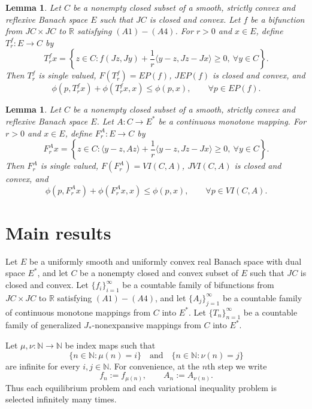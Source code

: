 \documentclass[leqno,12pt]{amsart}
\newtheorem{lemma}[theorem]{Lemma}
\theoremstyle{definition}
\numberwithin{equation}{section}
\begin{document}
\begin{lemma}\label{EPrezolvent}
Let $C$ be a nonempty closed subset of a smooth, strictly convex and reflexive Banach space $E$ such that $JC$ is closed and convex. Let $f$ be a bifunction from $JC\times JC$ to $\mathbb{R}$ satisfying $(A1)-(A4)$. For $r>0$ and $x\in E$, define $T_r^f:E\to C$ by
\[
T_r^f x=\left\{z\in C:f(Jz,Jy)+\frac{1}{r}\langle y-z,Jz-Jx\rangle\geq 0,\ \forall y\in C\right\}.
\]
Then $T_r^f$ is single valued, $F(T_r^f)=EP(f)$, $JEP(f)$ is closed and convex, and
\[
\phi(p,T_r^f x)+\phi(T_r^f x,x)\leq \phi(p,x),\qquad \forall p\in EP(f).
\]
\end{lemma}

\begin{lemma}\label{VIrezolvent}
Let $C$ be a nonempty closed subset of a smooth, strictly convex and reflexive Banach space $E$. Let $A:C\to E^{*}$ be a continuous monotone mapping. For $r>0$ and $x\in E$, define $F_r^A:E\to C$ by
\[
F_r^A x=\left\{z\in C:\langle y-z,Az\rangle+\frac{1}{r}\langle y-z,Jz-Jx\rangle\geq 0,\ \forall y\in C\right\}.
\]
Then $F_r^A$ is single valued, $F(F_r^A)=VI(C,A)$, $JVI(C,A)$ is closed and convex, and
\[
\phi(p,F_r^A x)+\phi(F_r^A x,x)\leq \phi(p,x),\qquad \forall p\in VI(C,A).
\]
\end{lemma}



\section{Main results}

Let $E$ be a uniformly smooth and uniformly convex real Banach space with dual space $E^{*}$, and let $C$ be a nonempty closed and convex subset of $E$ such that $JC$ is closed and convex. Let $\{f_i\}_{i=1}^{\infty}$ be a countable family of bifunctions from $JC\times JC$ to $\mathbb{R}$ satisfying $(A1)-(A4)$, and let $\{A_j\}_{j=1}^{\infty}$ be a countable family of continuous monotone mappings from $C$ into $E^{*}$. Let $\{T_n\}_{n=1}^{\infty}$ be a countable family of generalized $J_{*}$-nonexpansive mappings from $C$ into $E^{*}$.

Let $\mu,\nu:\mathbb{N}\to\mathbb{N}$ be index maps such that
\[
\{n\in\mathbb{N}:\mu(n)=i\}\quad\text{and}\quad
\{n\in\mathbb{N}:\nu(n)=j\}
\]
are infinite for every $i,j\in\mathbb{N}$. For convenience, at the $n$th step we write
\[
f_n:=f_{\mu(n)},\qquad A_n:=A_{\nu(n)}.
\]
Thus each equilibrium problem and each variational inequality problem is selected infinitely many times.
\end{document}
